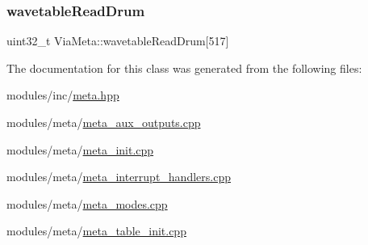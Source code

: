 \subsubsection{\texorpdfstring{wavetable\+Read\+Drum}{wavetableReadDrum}}
{\footnotesize\ttfamily uint32\+\_\+t Via\+Meta\+::wavetable\+Read\+Drum\mbox{[}517\mbox{]}}



The documentation for this class was generated from the following files\+:\begin{DoxyCompactItemize}
\item 
modules/inc/\mbox{\hyperlink{meta_8hpp}{meta.\+hpp}}\item 
modules/meta/\mbox{\hyperlink{meta__aux__outputs_8cpp}{meta\+\_\+aux\+\_\+outputs.\+cpp}}\item 
modules/meta/\mbox{\hyperlink{meta__init_8cpp}{meta\+\_\+init.\+cpp}}\item 
modules/meta/\mbox{\hyperlink{meta__interrupt__handlers_8cpp}{meta\+\_\+interrupt\+\_\+handlers.\+cpp}}\item 
modules/meta/\mbox{\hyperlink{meta__modes_8cpp}{meta\+\_\+modes.\+cpp}}\item 
modules/meta/\mbox{\hyperlink{meta__table__init_8cpp}{meta\+\_\+table\+\_\+init.\+cpp}}\end{DoxyCompactItemize}
